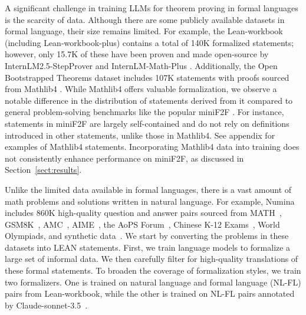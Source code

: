 A significant challenge in training LLMs for theorem proving in formal languages is the scarcity of data. Although there are some publicly available datasets in formal language, their size remains limited. For example, the Lean-workbook (including Lean-workbook-plus) \citep{ying2024lean, wu2024internlm2} contains a total of 140K formalized statements; however, only 15.7K of these have been proven and made open-source by InternLM2.5-StepProver and InternLM-Math-Plus \citep{ying2024lean, wu2024internlm2, ying2024internlm}. Additionally, the Open Bootstrapped Theorems dataset \citep{wang2024theoremllama} includes 107K statements with proofs sourced from Mathlib4 \citep{mathlib4}. While Mathlib4 offers valuable formalization, we observe a notable difference in the distribution of statements derived from it compared to general problem-solving benchmarks like the popular miniF2F \citep{zheng2021minif2f}. For instance, statements in miniF2F are largely self-contained and do not rely on definitions introduced in other statements, unlike those in Mathlib4. See appendix for examples of Mathlib4 statements. Incorporating Mathlib4 data into training does not consistently enhance performance on miniF2F, as discussed in Section~\ref{sect:results}.

Unlike the limited data available in formal languages, there is a vast amount of math problems and solutions written in natural language. For example, Numina~\citep{li2024numinamath} includes 860K high-quality question and answer pairs sourced from MATH~\citep{hendrycks2021measuring}, GSM8K~\citep{cobbe2021training}, AMC~\citep{aops_wiki}, AIME~\citep{maa_aime_2024}, the AoPS Forum~\citep{aops_wiki}, Chinese K-12 Exams~\citep{shao2024deepseekmath}, World Olympiads, and synthetic data~\citep{mitra2024orca}. We start by converting the problems in these datasets into LEAN statements. First, we train language models to formalize a large set of informal data. We then carefully filter for high-quality translations of these formal statements. To broaden the coverage of formalization styles, we train two formalizers. One is trained on natural language and formal language (NL-FL) pairs from Lean-workbook, while the other is trained on NL-FL pairs annotated by Claude-sonnet-3.5~\citep{anthropic2024a}.


